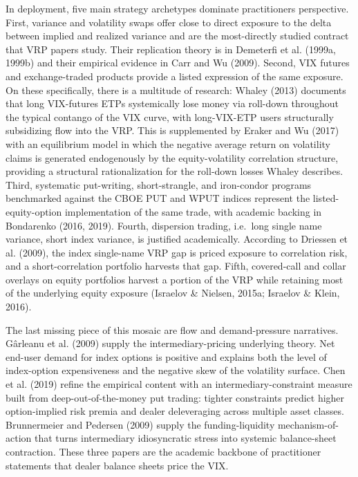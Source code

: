 \documentclass[11pt,a4paper]{article}
\begin{document}
In deployment, five main strategy archetypes dominate practitioners perspective. First, variance and volatility swaps offer close to direct exposure to the delta between implied and realized variance and are the most-directly studied contract that VRP papers study. Their replication theory is in Demeterfi et al. (1999a, 1999b) and their empirical evidence in Carr and Wu (2009). Second, VIX futures and exchange-traded products provide a listed expression of the same exposure. On these specifically, there is a multitude of research: Whaley (2013) documents that long VIX-futures ETPs systemically lose money via roll-down throughout the typical contango of the VIX curve, with long-VIX-ETP users structurally subsidizing flow into the VRP. This is supplemented by Eraker and Wu (2017) with an equilibrium model in which the negative average return on volatility claims is generated endogenously by the equity-volatility correlation structure, providing a structural rationalization for the roll-down losses Whaley describes. Third, systematic put-writing, short-strangle, and iron-condor programs benchmarked against the CBOE PUT and WPUT indices represent the listed-equity-option implementation of the same trade, with academic backing in Bondarenko (2016, 2019). Fourth, dispersion trading, i.e.\ long single name variance, short index variance, is justified academically. According to Driessen et al. (2009), the index single-name VRP gap is priced exposure to correlation risk, and a short-correlation portfolio harvests that gap. Fifth, covered-call and collar overlays on equity portfolios harvest a portion of the VRP while retaining most of the underlying equity exposure (Israelov \& Nielsen, 2015a; Israelov \& Klein, 2016).

The last missing piece of this mosaic are flow and demand-pressure narratives. G\^arleanu et al. (2009) supply the intermediary-pricing underlying theory. Net end-user demand for index options is positive and explains both the level of index-option expensiveness and the negative skew of the volatility surface. Chen et al. (2019) refine the empirical content with an intermediary-constraint measure built from deep-out-of-the-money put trading: tighter constraints predict higher option-implied risk premia and dealer deleveraging across multiple asset classes. Brunnermeier and Pedersen (2009) supply the funding-liquidity mechanism-of-action that turns intermediary idiosyncratic stress into systemic balance-sheet contraction. These three papers are the academic backbone of practitioner statements that dealer balance sheets price the VIX.
\end{document}
